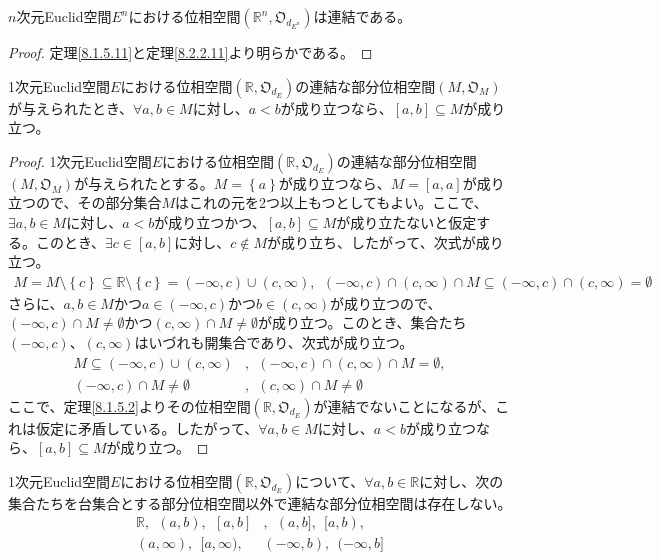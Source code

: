 \documentclass[dvipdfmx]{jsarticle}
\begin{document}
\begin{thm}\label{8.2.2.12}
$n$次元Euclid空間$E^{n}$における位相空間$\left( \mathbb{R}^{n},\mathfrak{O}_{d_{E^{n}}} \right)$は連結である。
\end{thm}
\begin{proof} 定理\ref{8.1.5.11}と定理\ref{8.2.2.11}より明らかである。
\end{proof}
\begin{thm}\label{8.2.2.13}
1次元Euclid空間$E$における位相空間$\left( \mathbb{R},\mathfrak{O}_{d_{E}} \right)$の連結な部分位相空間$\left( M,\mathfrak{O}_{M} \right)$が与えられたとき、$\forall a,b \in M$に対し、$a < b$が成り立つなら、$[ a,b] \subseteq M$が成り立つ。
\end{thm}
\begin{proof}
1次元Euclid空間$E$における位相空間$\left( \mathbb{R},\mathfrak{O}_{d_{E}} \right)$の連結な部分位相空間$\left( M,\mathfrak{O}_{M} \right)$が与えられたとする。$M = \left\{ a \right\}$が成り立つなら、$M = [ a,a]$が成り立つので、その部分集合$M$はこれの元を2つ以上もつとしてもよい。ここで、$\exists a,b \in M$に対し、$a < b$が成り立つかつ、$[ a,b] \subseteq M$が成り立たないと仮定する。このとき、$\exists c \in [ a,b]$に対し、$c \notin M$が成り立ち、したがって、次式が成り立つ。
\begin{align*}
M = M \setminus \left\{ c \right\} \subseteq \mathbb{R} \setminus \left\{ c \right\} = ( - \infty,c) \cup (c,\infty),\ \ ( - \infty,c) \cap (c,\infty) \cap M \subseteq ( - \infty,c) \cap (c,\infty) = \emptyset
\end{align*}
さらに、$a,b \in M$かつ$a \in ( - \infty,c)$かつ$b \in (c,\infty)$が成り立つので、$( - \infty,c) \cap M \neq \emptyset$かつ$(c,\infty) \cap M \neq \emptyset$が成り立つ。このとき、集合たち$( - \infty,c)$、$(c,\infty)$はいづれも開集合であり、次式が成り立つ。
\begin{align*}
M \subseteq ( - \infty,c) \cup (c,\infty)&,\ \ ( - \infty,c) \cap (c,\infty) \cap M = \emptyset,\\
( - \infty,c) \cap M \neq \emptyset&,\ \ (c,\infty) \cap M \neq \emptyset
\end{align*}
ここで、定理\ref{8.1.5.2}よりその位相空間$\left( \mathbb{R},\mathfrak{O}_{d_{E}} \right)$が連結でないことになるが、これは仮定に矛盾している。したがって、$\forall a,b \in M$に対し、$a < b$が成り立つなら、$[ a,b] \subseteq M$が成り立つ。
\end{proof}
\begin{thm}\label{8.2.2.14}
1次元Euclid空間$E$における位相空間$\left( \mathbb{R},\mathfrak{O}_{d_{E}} \right)$について、$\forall a,b \in \mathbb{R}$に対し、次の集合たちを台集合とする部分位相空間以外で連結な部分位相空間は存在しない。
\begin{align*}
\mathbb{R},\ \ (a,b),\ \ [ a,b]&,\ \ (a,b],\ \ [ a,b),\\ 
(a,\infty),\ \ [ a,\infty),\ \ &( - \infty,b),\ \ ( - \infty,b]
\end{align*}
\end{thm}
\end{document}
